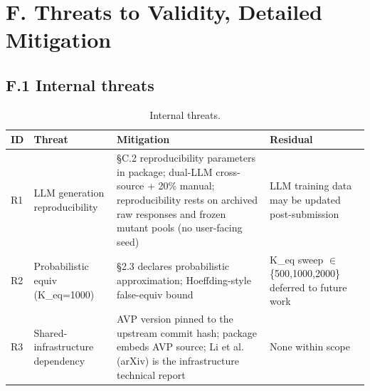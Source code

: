 \documentclass[manuscript,screen,review]{acmart}
\begin{document}

\section{F. Threats to Validity, Detailed Mitigation}\label{f.-threats-to-validity-detailed-mitigation}

\subsection{F.1 Internal threats}\label{f.1-internal-threats}

{%
\begin{longtable}[]{@{}
  >{\raggedright\arraybackslash}p{}
  >{\raggedright\arraybackslash}p{}
  >{\raggedright\arraybackslash}p{}
  >{\raggedright\arraybackslash}p{}@{}}
\caption{Internal threats.}\label{tab:p2-27}\\
\toprule\noalign{}
\begin{minipage}[b]{\linewidth}\raggedright
ID
\end{minipage} & \begin{minipage}[b]{\linewidth}\raggedright
Threat
\end{minipage} & \begin{minipage}[b]{\linewidth}\raggedright
Mitigation
\end{minipage} & \begin{minipage}[b]{\linewidth}\raggedright
Residual
\end{minipage} \\
\midrule\noalign{}
\endfirsthead
\endhead
\bottomrule\noalign{}
\endlastfoot
R1 & LLM generation reproducibility & §C.2 reproducibility parameters in
package; dual-LLM cross-source + 20\% manual; reproducibility rests on
archived raw responses and frozen mutant pools (no user-facing seed) & LLM training data may be updated
post-submission \\
R2 & Probabilistic equiv (K\_eq=1000) & §2.3 declares probabilistic
approximation; Hoeffding-style false-equiv bound & K\_eq sweep $\in$
\{500,1000,2000\} deferred to future work \\
R3 & Shared-infrastructure dependency & AVP version pinned to the upstream commit hash;
package embeds AVP source; Li et al. (arXiv) is the infrastructure technical report &
None within scope \\

\end{longtable}}
\end{document}
